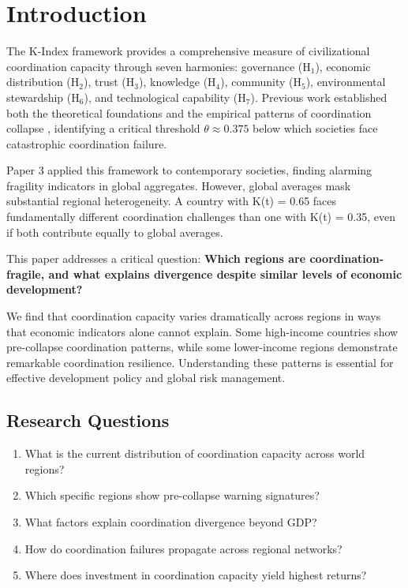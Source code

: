 \documentclass[12pt,a4paper]{article}
\begin{document}
\section{Introduction}
\label{sec:intro}

The K-Index framework \citep{Paper1} provides a comprehensive measure of civilizational coordination capacity through seven harmonies: governance (H$_1$), economic distribution (H$_2$), trust (H$_3$), knowledge (H$_4$), community (H$_5$), environmental stewardship (H$_6$), and technological capability (H$_7$). Previous work established both the theoretical foundations \citep{Paper1} and the empirical patterns of coordination collapse \citep{Paper2}, identifying a critical threshold $\theta \approx 0.375$ below which societies face catastrophic coordination failure.

Paper 3 \citep{Paper3} applied this framework to contemporary societies, finding alarming fragility indicators in global aggregates. However, global averages mask substantial regional heterogeneity. A country with K(t) = 0.65 faces fundamentally different coordination challenges than one with K(t) = 0.35, even if both contribute equally to global averages.

This paper addresses a critical question: \textbf{Which regions are coordination-fragile, and what explains divergence despite similar levels of economic development?}

We find that coordination capacity varies dramatically across regions in ways that economic indicators alone cannot explain. Some high-income countries show pre-collapse coordination patterns, while some lower-income regions demonstrate remarkable coordination resilience. Understanding these patterns is essential for effective development policy and global risk management.

\subsection{Research Questions}

\begin{enumerate}
    \item What is the current distribution of coordination capacity across world regions?
    \item Which specific regions show pre-collapse warning signatures?
    \item What factors explain coordination divergence beyond GDP?
    \item How do coordination failures propagate across regional networks?
    \item Where does investment in coordination capacity yield highest returns?
\end{enumerate}
\end{document}
